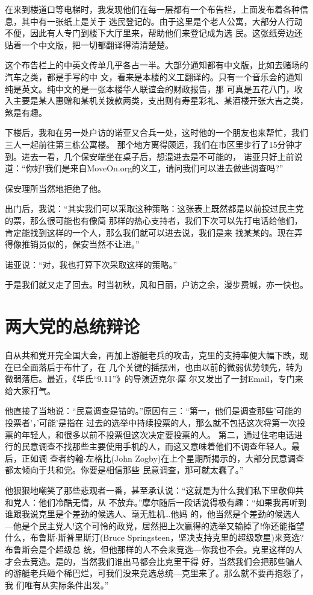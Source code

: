 ﻿\documentclass[11pt]{article}
\begin{document}
在来到楼道口等电梯时，我发现他们在每一层都有一个布告栏，上面发布着各种信息，其中有一张纸上是关于
选民登记的。由于这里是个老人公寓，大部分人行动不便，因此有人专门到楼下大厅里来，帮助他们来登记成为选
民。这张纸旁边还贴着一个中文版，把一切都翻译得清清楚楚。

这个布告栏上的中英文传单几乎各占一半。大部分通知都有中文版，比如去赌场的汽车之类，都是手写的中
文，看来是本楼的义工翻译的。只有一个音乐会的通知纯是英文。纯中文的是一张本楼华人联谊会的财政报告，那
可真是五花八门，收入主要是某人惠赠和某机关拨款两类，支出则有寿星彩礼、某酒楼开张大吉之类，煞是有趣。

下楼后，我和在另一处户访的诺亚又合兵一处，这时他的一个朋友也来帮忙，我们三人一起前往第三栋公寓楼。
那个地方离得颇远，我们在市区里步行了15分钟才到。进去一看，几个保安端坐在桌子后，想混进去是不可能的，
诺亚只好上前说道：``你好!我们是来自MoveOn.org的义工，请问我们可以进去做些调查吗?''

保安理所当然地拒绝了他。

出门后，我说：``其实我们可以采取这种策略：这张表上既然都是以前投过民主党的票，那么很可能也有像简
那样的热心支持者，我们下次可以先打电话给他们，肯定能找到这样的一个人，那么我们就可以进去说，我们是来
找某某的。现在弄得像推销员似的，保安当然不让进。''

诺亚说：``对，我也打算下次采取这样的策略。''

于是我们就又走了回去。时当初秋，风和日丽，户访之余，漫步费城，亦一快也。

\section{两大党的总统辩论}

自从共和党开完全国大会，再加上游艇老兵的攻击，克里的支持率便大幅下跌，现在已全面落后于布什了，在
几个关键的摇摆州，也由以前的微弱优势领先，转为微弱落后。最近，《华氏``9.11''》的导演迈克尔$\cdot$摩
尔又发出了一封Email，专门来给大家打气。

他直接了当地说：``民意调查是错的。''原因有三：``第一，他们是调查那些'可能的投票者'，'可能'是指在
过去的选举中持续投票的人，那么就不包括这次将第一次投票的年轻人，和很多以前不投票但这次决定要投票的人。
第二，通过住宅电话进行的民意调查不找那些主要使用手机的人，而这又意味着他们不调查年轻人。最后，正如调
查者约翰$\cdot$左格比(John Zogby)在上个星期所揭示的，大部分民意调查都太倾向于共和党。你要是相信那些
民意调查，那可就太蠢了。''

他狠狠地嘲笑了那些悲观者一番，甚至承认说：``这就是为什么我们私下里敬仰共和党人：他们冷酷无情，从
不放弃。''摩尔随后一段话说得极有趣：``如果我再听到谁跟我说克里是个差劲的候选人、毫无胜机\ldots 他妈
的，他当然是个差劲的候选人---他是个民主党人!这个可怜的政党，居然把上次赢得的选举又输掉了!你还能指望
什么，布鲁斯$\cdot$斯普里斯汀(Bruce Springsteen，坚决支持克里的超级歌星)来竞选?布鲁斯会是个超级总
统，但他那样的人不会来竞选---你我也不会。克里这样的人才会去竞选。是的，当然我们谁出马都会比克里干得
好，当然我们会把那些骗人的游艇老兵砸个稀巴烂，可我们没来竞选总统---克里来了。那么就不要再抱怨了，我
们唯有从实际条件出发。''
\end{document}
